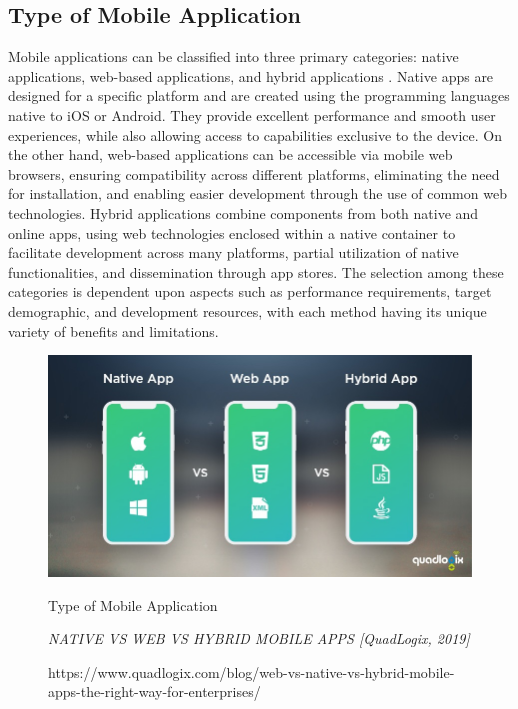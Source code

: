 \subsection{Type of Mobile Application}
Mobile applications can be classified into three primary categories: native applications, web-based applications, and hybrid applications \parencite{syeed21}. Native apps are designed for a specific platform and are created using the programming languages native to iOS or Android. They provide excellent performance and smooth user experiences, while also allowing access to capabilities exclusive to the device. On the other hand, web-based applications can be accessible via mobile web browsers, ensuring compatibility across different platforms, eliminating the need for installation, and enabling easier development through the use of common web technologies. Hybrid applications combine components from both native and online apps, using web technologies enclosed within a native container to facilitate development across many platforms, partial utilization of native functionalities, and dissemination through app stores. The selection among these categories is dependent upon aspects such as performance requirements, target demographic, and development resources, with each method having its unique variety of benefits and limitations.

\begin{figure}[h]
    \centering
    \includegraphics[width=1.0\linewidth]{mainmatter/images/typeapp.jpg}
    \caption{Type of Mobile Application}
    \caption*{\textit{NATIVE VS WEB VS HYBRID MOBILE APPS [QuadLogix, 2019]}}
    \caption*{https://www.quadlogix.com/blog/web-vs-native-vs-hybrid-mobile-apps-the-right-way-for-enterprises/}
    \label{fig:myfig9}
\end{figure}

